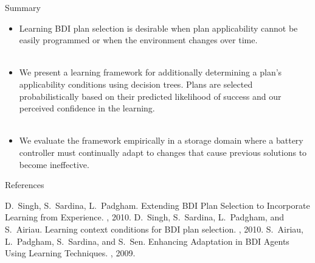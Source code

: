 \documentclass[10pt]{beamer}
\newcounter{finalframe}
\begin{document}
\begin{frame}[<+->]{Summary}
\action{}
\begin{itemize}
\item Learning BDI plan selection is desirable when plan applicability cannot be easily programmed or when the \alert{environment changes over time}.\\~\\
\item We present a \alert{learning framework} for additionally determining a plan's applicability conditions using decision trees. Plans are selected \alert{probabilistically} based on their predicted likelihood of success and our perceived \alert{confidence} in the learning.\\~\\
\item We evaluate the framework empirically in a storage domain where a battery controller must continually adapt to \alert{changes that cause previous solutions to become ineffective}.
\end{itemize}
\end{frame}

\setcounter{finalframe}{\value{framenumber}}
\appendix 

\begin{frame}{References}
\setcounter{framenumber}{\value{finalframe}}
  \begin{thebibliography}{10}
  \beamertemplatearticlebibitems
	D.~Singh, S.~Sardina, L.~Padgham.
	\newblock Extending BDI Plan Selection to Incorporate Learning from Experience.
	, 2010.
	D.~Singh, S.~Sardina, L.~Padgham, and S.~Airiau.
	\newblock Learning context conditions for BDI plan selection.
	, 2010.
	S.~Airiau, L.~Padgham, S.~Sardina, and S.~Sen.
	\newblock Enhancing Adaptation in {BDI} Agents Using Learning Techniques.
	, 2009.\\~\\
  \end{thebibliography}

\begin{block}{}\end{block}

\end{frame}


\end{document}
